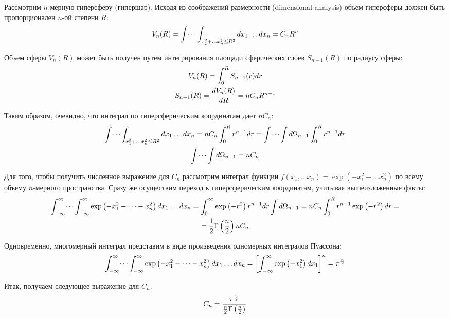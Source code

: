 \documentclass[14pt]{article}
\newcommand{\lb}{\left(}
\newcommand{\rb}{\right)}
\begin{document}
\newpage

Рассмотрим $n$-мерную гиперсферу (гипершар). Исходя из соображений размерности (dimensional analysis) объем гиперсферы должен быть пропорционален $n$-ой степени $R$:
\begin{gather}
	V_n (R) = \int \dots \int_{x_1^2 + \dots x_n^2 \leq R^2} dx_1 \dots dx_n = C_n R^n \notag
\end{gather}

Объем сферы $V_n(R)$ может быть получен путем интегрирования площади сферических слоев $S_{n-1}(R)$ по радиусу сферы:
\begin{gather}
	V_n(R) = \int_{0}^{R} S_{n-1}(r) dr \notag \\
	S_{n-1}(R) = \frac{d V_n(R)}{dR} = nC_n R^{n-1} \notag 
\end{gather}

Таким образом, очевидно, что интеграл по гиперсферическим координатам дает $nC_n$:
\begin{gather}
	\int \dots \int_{x_1^2 + \dots x_n^2 \leq R^2} dx_1 \dots dx_n = n C_n \int_{0}^{R} r^{n-1} dr = \int \dots \int d \Omega_{n-1} \int_{0}^{R} r^{n-1} dr \notag \\
	\int \dots \int d \Omega_{n-1} = n C_n \notag
\end{gather}

Для того, чтобы получить численное выражение для $C_n$ рассмотрим интеграл функции $f(x_1, \dots x_n) = \exp \lb -x_1^2 - \dots x_n^2 \rb$ по всему объему $n$-мерного пространства. Сразу же осуществим переход к гиперсферическим координатам, учитывая вышеизложенные факты:
\begin{gather}
	\int_{-\infty}^{\infty} \dots \int_{-\infty}^{\infty} \exp \lb -x_1^2 - \dots -x_n^2 \rb dx_1 \dots dx_n = \int_{0}^{\infty} \exp \lb -r^2 \rb r^{n-1} dr \int d \Omega_{n-1}  = n C_n \int_{0}^{R} r^{n-1} \exp \lb -r^2 \rb dr= \notag \\
	= \frac{1}{2} \Gamma \lb \frac{n}{2} \rb n C_n \notag
\end{gather}

Одновременно, многомерный интеграл представим в виде произведения одномерных интегралов Пуассона:
\begin{gather}
	\int_{-\infty}^{\infty} \dots \int_{-\infty}^{\infty} \exp \lb -x_1^2 - \dots - x_n^2 \rb d x_1 \dots dx_n = \left[ \int_{-\infty}^{\infty} \exp \lb -x_1^2 \rb dx_1 \right]^n  = \pi^\frac{n}{2} \notag 
\end{gather}

Итак, получаем следующее выражение для $C_n$:
\begin{gather}
	C_n = \frac{\pi^\frac{n}{2}}{\frac{n}{2} \Gamma \lb \frac{n}{2} \rb} \notag
\end{gather}
\end{document}
